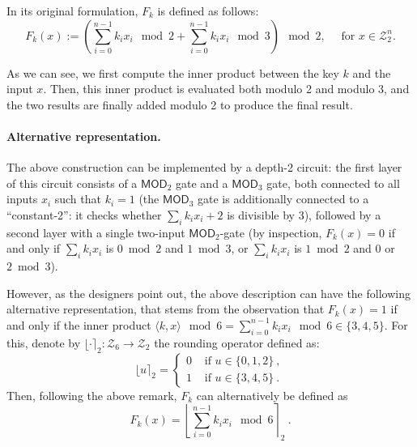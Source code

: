 \documentclass[journal=tosc,submission]{iacrtrans}
\theoremstyle{theorem}
\newcommand\MOD{\ensuremath{\mathsf{MOD}}\xspace}
\newcommand\Z{\mathcal{Z}}
\newcommand\lp[1]{\textcolor{blue!80}{\textbf{Léo:} #1}}
\begin{document}
In its original formulation, $F_k$ is defined as follows:
    \begin{equation} \label{eq:bipsw_orig}
    F_k(x) := \left(\sum_{i = 0}^{n-1} k_i x_i \mod 2 + \sum_{i = 0}^{n-1} k_i x_i \mod 3\right) \mod{2}, \quad \text{ for } x \in \Z_2^n.  
    \end{equation}


As we can see, we first compute the inner product between the key $k$ and the input $x$. Then, this inner product is evaluated both modulo 2 and modulo 3, and the two results are finally added modulo 2 to produce the final result.  

\paragraph{Alternative representation.} The above construction can be implemented by a depth-2 circuit: %
the first layer of this circuit consists of a $\mathsf{MOD}_2$ gate and a $\MOD_3$ gate, both connected to all inputs $x_i$ such that $k_i = 1$ (the $\MOD_3$ gate is additionally connected to a ``constant-2'': it checks whether $\sum_i k_ix_i+2$ is divisible by $3$), followed by a second layer with a single two-input $\MOD_2$-gate (by inspection, $F_k(x) = 0$ if and only if $\sum_i k_ix_i$ is $0 \bmod 2$ and $1 \bmod 3$, or $\sum_i k_ix_i$ is $1 \bmod 2$ and 0 or $2 \bmod 3$).

However, as the designers point out, the above description can have the following alternative representation, that stems from the observation that $F_k(x) = 1$ if and only if the inner product $\langle k, x \rangle  \mod{6} = \sum_{i = 0}^{n-1} k_i x_i \mod{6} \in \{3,4,5\}$. For this, denote by $\lfloor \cdot \rceil_2 : \Z_6 \rightarrow \Z_2$ the rounding operator defined as:
\begin{equation*}
\lfloor u \rceil_2 = \left\{
\begin{array}{rl}
0 & \text{ if } u \in \{0,1,2\}~, \\
1 & \text{ if } u \in \{3,4,5\}~.
\end{array}
\right.
\end{equation*}
Then, following the above remark, $F_k$ can alternatively be defined as
 \begin{equation} \label{eq:bipsw}
F_k(x) = \left\lfloor \sum_{i = 0}^{n-1} k_i x_i  \mod{6} \right\rceil_2~.
\end{equation}
\end{document}

